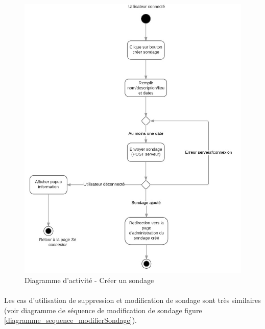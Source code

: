 \documentclass[titlepage]{report}
\begin{document}
\begin{figure}[h]
	\caption{Diagramme d'activité - Créer un sondage}
	\label{diagramme_activite_creerSondage}
	\centering
	\includegraphics[scale=0.8]{figures/diagrammes/activite_creerSondage.png}
\end{figure}

\paragraph{} Les cas d'utilisation de suppression et modification de sondage sont très similaires (voir diagramme de séquence de modification de sondage figure \ref{diagramme_sequence_modifierSondage}).
\end{document}
